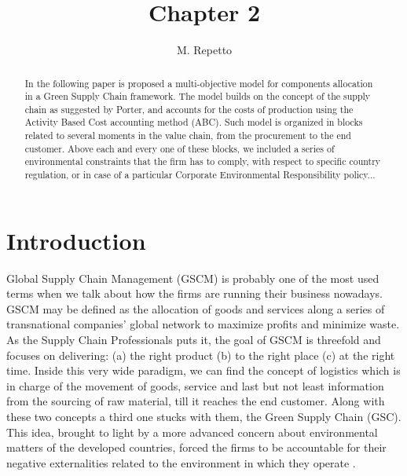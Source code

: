 \documentclass{article}
\begin{document}
  \title{Chapter 2}

  \author{M. Repetto}

  \date{}

\maketitle

\begin{abstract}
  In the following paper is proposed a multi-objective model for components allocation in a Green Supply Chain framework. The model builds on the concept of the supply chain as suggested by Porter, and accounts for the costs of production using the Activity Based Cost accounting method (ABC). Such model is organized in blocks related to several moments in the value chain, from the procurement to the end customer. Above each and every one of these blocks, we included a series of environmental constraints that the firm has to comply, with respect to specific country regulation, or in case of a particular Corporate Environmental Responsibility policy...
\end{abstract}

\section{Introduction}
  Global Supply Chain Management (GSCM) is probably one of the most used terms when we talk about how the firms are running their business nowadays. GSCM may be defined as the allocation of goods and services along a series of transnational companies' global network to maximize profits and minimize waste. As the Supply Chain Professionals puts it, the goal of GSCM is threefold and focuses on delivering: (a) the right product (b) to the right place (c) at the right time.
  Inside this very wide paradigm, we can find the concept of logistics which is in charge of the movement of goods, service and last but not least information from the sourcing of raw material, till it reaches the end customer.
  Along with these two concepts a third one stucks with them, the Green Supply Chain (GSC). This idea, brought to light by a more advanced concern about environmental matters of the developed countries, forced the firms to be accountable for their negative externalities related to the environment in which they operate \cite{srivastava_green_2007}.
\end{document}
